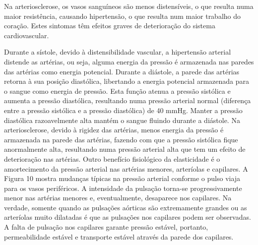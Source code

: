 \documentclass[
  portuguese,
  ]{book}
\begin{document}
Na arteriosclerose, os vasos sanguíneos são menos distensíveis, o que resulta numa maior resistência, causando hipertensão, o que resulta num maior trabalho do coração. Estes sintomas têm efeitos graves de deterioração do sistema cardiovascular.

Durante a sístole, devido à distensibilidade vascular, a hipertensão arterial distende as artérias, ou seja, alguma energia da pressão é armazenada nas paredes das artérias como energia potencial. Durante a diástole, a parede das artérias retorna à sua posição diastólica, libertando a energia potencial armazenada para o sangue como energia de pressão. Esta função atenua a pressão sistólica e aumenta a pressão diastólica, resultando numa pressão arterial normal (diferença entre a pressão sistólica e a pressão diastólica) de 40 mmHg. Manter a pressão diastólica razoavelmente alta mantém o sangue fluindo durante a diástole. Na arteriosclerose, devido à rigidez das artérias, menos energia da pressão é armazenada na parede das artérias, fazendo com que a pressão sistólica fique anormalmente alta, resultando numa pressão arterial alta que tem um efeito de deterioração nas artérias.
Outro benefício fisiológico da elasticidade é o amortecimento da pressão arterial nas artérias menores, arteríolas e capilares. A Figura 10 mostra mudanças típicas na pressão arterial conforme o pulso viaja para os vasos periféricos. A intensidade da pulsação torna-se progressivamente menor nas artérias menores e, eventualmente, desaparece nos capilares. Na verdade, somente quando as pulsações aórticas são extremamente grandes ou as arteríolas muito dilatadas é que as pulsações nos capilares podem ser observadas. A falta de pulsação nos capilares garante pressão estável, portanto, permeabilidade estável e transporte estável através da parede dos capilares.
\end{document}

